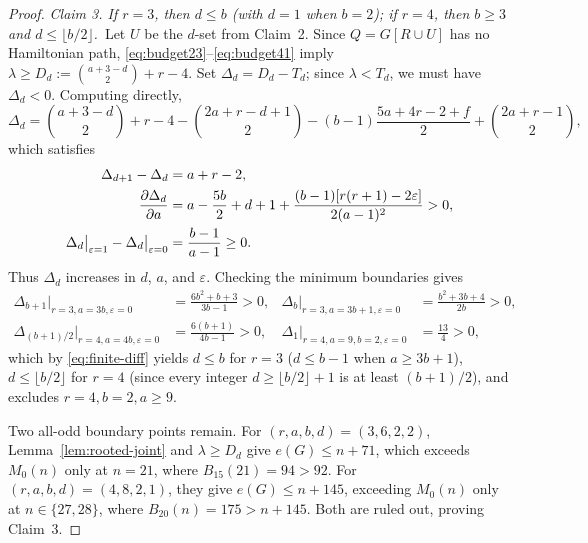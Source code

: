 \documentclass[10pt]{article}
\theoremstyle{compactplain}
\theoremstyle{remark}\newtheorem{remark}[theorem]{Remark}
\begin{document}
\begin{proof}
\medskip\noindent\emph{Claim 3. If $r=3$, then $d\le b$ (with $d=1$ when
$b=2$); if $r=4$, then $b\ge3$ and $d\le\lfloor b/2\rfloor$.}\ 
Let $U$ be the $d$-set from Claim~2. Since $Q=G[R\cup U]$ has no
Hamiltonian path, \eqref{eq:budget23}--\eqref{eq:budget41} imply
$\lambda\ge D_d:=\binom{a+3-d}{2}+r-4$. Set $\Delta_d=D_d-T_d$; since
$\lambda<T_d$, we must have $\Delta_d<0$. Computing directly,
\[
 \Delta_d=\binom{a+3-d}{2}+r-4-\binom{2a+r-d+1}{2}
 -(b-1)\frac{5a+4r-2+f}{2}+\binom{2a+r-1}{2},
\]
which satisfies
\begin{align}
 \Delta_{d+1}-\Delta_d &= a+r-2, \label{eq:finite-diff}\\
 \frac{\partial\Delta_d}{\partial a}
 &= a-\frac{5b}{2}+d+1+\frac{(b-1)[r(r+1)-2\varepsilon]}{2(a-1)^2}>0,
 \notag\\
 \Delta_d\big|_{\varepsilon=1}-\Delta_d\big|_{\varepsilon=0}
 &= \frac{b-1}{a-1}\ge0. \notag
\end{align}
Thus $\Delta_d$ increases in $d$, $a$, and $\varepsilon$. Checking the
minimum boundaries gives
\begin{align*}
 \Delta_{b+1}\big|_{r=3,a=3b,\varepsilon=0} &= \frac{6b^2+b+3}{3b-1}>0,
 & \Delta_b\big|_{r=3,a=3b+1,\varepsilon=0} &= \frac{b^2+3b+4}{2b}>0,\\
 \Delta_{(b+1)/2}\big|_{r=4,a=4b,\varepsilon=0} &= \frac{6(b+1)}{4b-1}>0,
 & \Delta_1\big|_{r=4,a=9,b=2,\varepsilon=0} &= \frac{13}{4}>0,
\end{align*}
which by \eqref{eq:finite-diff} yields $d\le b$ for $r=3$ ($d\le b-1$
when $a\ge3b+1$), $d\le\lfloor b/2\rfloor$ for $r=4$ (since every
integer $d\ge\lfloor b/2\rfloor+1$ is at least $(b+1)/2$), and excludes
$r=4,b=2,a\ge9$.

Two all-odd boundary points remain. For $(r,a,b,d)=(3,6,2,2)$,
Lemma~\ref{lem:rooted-joint} and $\lambda\ge D_d$ give $e(G)\le n+71$,
which exceeds $M_0(n)$ only at $n=21$, where $B_{15}(21)=94>92$. For
$(r,a,b,d)=(4,8,2,1)$, they give $e(G)\le n+145$, exceeding $M_0(n)$
only at $n\in\{27,28\}$, where $B_{20}(n)=175>n+145$. Both are ruled
out, proving Claim~3.


\end{proof}
\end{document}
